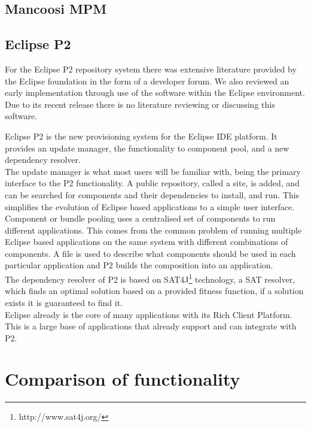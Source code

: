 \subsection{Mancoosi MPM}

\subsection{Eclipse P2}

For the Eclipse P2 repository system there was extensive literature provided by the Eclipse foundation in the form of a developer forum.
We also reviewed an early implementation through use of the software within the Eclipse environment.
Due to its recent release there is no literature reviewing or discussing this software.

Eclipse P2
is the new provisioning system for the Eclipse IDE platform.
It provides an update manager, the functionality to component pool, and a new dependency resolver.\\
The update manager is what most users will be familiar with, being the primary interface to the P2 functionality. 
A public repository, called a site, is added, and can be searched for components and their dependencies to install, and run.
This simplifies the evolution of Eclipse based applications to a simple user interface.\\
Component or bundle pooling uses a centralised set of components to run different applications.
This comes from the common problem of running multiple Eclipse based applications on the same system with different combinations of components.
A file is used to describe what components should be used in each particular application and P2 builds the composition into an application.\\
The dependency resolver of P2 is based on SAT4J\footnote{http://www.sat4j.org/} technology, a SAT resolver, which finds an optimal solution based on
a provided fitness function, if a solution exists it is guaranteed to find it.\\  
Eclipse already is
the core of many applications with its Rich Client Platform. This is a large base of applications that already support and can integrate with P2.

\section{Comparison of functionality}

